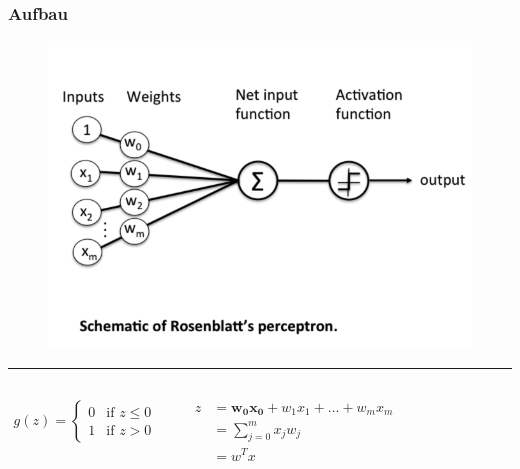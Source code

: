 \begin{frame}
\frametitle{Aufbau}

\begin{figure}
\includegraphics[width=.6\linewidth]{./geschichtliches/perceptron/img/perceptron_schematisch_alpha}
\end{figure}

\hrule


\begin{columns}

\begin{align*}
g(z) =\begin{cases}
	0 & \mbox{if } z \leq 0 \\
    1 & \mbox{if } z > 0
  \end{cases}
\end{align*}
\vspace{1mm}

\begin{align*}
\begin{split}
z & = \mathbf{w_0x_{0}} + w_1x_{1} + \dots + w_mx_{m} \\
 & = \sum_{j=0}^{m} x_{j}w_{j} \\
 & = w^Tx
\end{split}
\end{align*}

\end{columns}



\end{frame}


